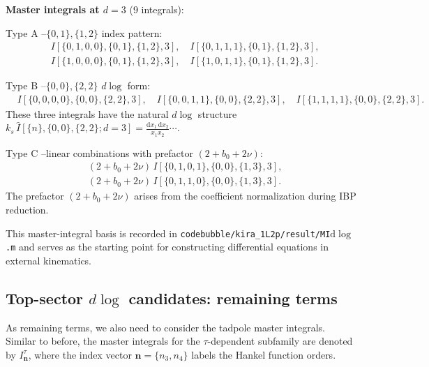 \documentclass[a4paper]{article}
\def\di{{\mathrm{d}}}
\begin{document}
\textbf{Master integrals at $d=3$} (9 integrals):

Type A --$\{0,1\}, \{1,2\}$ index pattern:
\begin{align}
	& I[\{0, 1, 0, 0\}, \{0, 1\}, \{1, 2\}, 3], \quad
	I[\{0, 1, 1, 1\}, \{0, 1\}, \{1, 2\}, 3], \nonumber\\
	& I[\{1, 0, 0, 0\}, \{0, 1\}, \{1, 2\}, 3], \quad
	I[\{1, 0, 1, 1\}, \{0, 1\}, \{1, 2\}, 3].
\end{align}

Type B --$\{0,0\}, \{2,2\}$ $d\log$ form:
\begin{align}
	& I[\{0, 0, 0, 0\}, \{0, 0\}, \{2, 2\}, 3], \quad
	I[\{0, 0, 1, 1\}, \{0, 0\}, \{2, 2\}, 3], \quad
	I[\{1, 1, 1, 1\}, \{0, 0\}, \{2, 2\}, 3].
\end{align}
These three integrals have the natural $d\log$ structure $k_s\,\hat{I}[\{n\},\{0,0\},\{2,2\};d=3] = \frac{\di x_1\,\di x_2}{x_1 x_2} \cdots$.

Type C --linear combinations with prefactor $(2+b_0+2\nu)$:
\begin{align}
	& (2 + b_0 + 2\nu)\,I[\{0, 1, 0, 1\}, \{0, 0\}, \{1, 3\}, 3], \nonumber\\
	& (2 + b_0 + 2\nu)\,I[\{0, 1, 1, 0\}, \{0, 0\}, \{1, 3\}, 3].
\end{align}
The prefactor $(2+b_0+2\nu)$ arises from the coefficient normalization during IBP reduction.

This master-integral basis is recorded in \texttt{codebubble/kira\_1L2p/result/MI$\di \log$.m} and serves as the starting point for constructing differential equations in external kinematics.

\subsection{Top-sector \texorpdfstring{$d\log$}{$\di \log$} candidates: remaining terms}
As remaining terms, we also need to consider the tadpole master integrals. Similar to before, the master integrals for the $\tau$-dependent subfamily are denoted by $I^{\tau}_{\bm n}$, where the index vector $\bm n=\{n_3,n_4\}$ labels the Hankel function orders.
\end{document}
